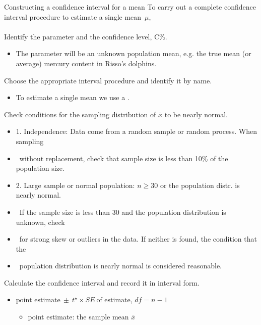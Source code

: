 \begin{onebox}{Constructing a confidence interval for a mean}
To carry out a complete confidence interval procedure to estimate a single \mbox{mean $\mu$,}
\\
\\
 Identify the parameter and the confidence level, C\%. \vspace{-1mm}
\begin{itemize} 
\item[] The parameter will be an unknown population mean, e.g. the true mean (or average) mercury content in Risso's dolphins.
\end{itemize}
 Choose the appropriate interval procedure and identify it by name.\vspace{-1mm}
\begin{itemize}
\item[] To estimate a single mean we use a .
\end{itemize}
 Check conditions for the sampling distribution of $\bar{x}$ to be nearly normal.\vspace{-1mm}
\begin{itemize}
\setlength{\itemsep}{0mm}
\item[] 1. Independence:  Data come from a random sample or random process.  When sampling 
\item[] \quad \ without replacement, check that sample size is less than 10\% of the population size.
\item[] 2. Large sample or normal population:  $n\ge 30$ or the population distr. is nearly normal.
\item[] \quad \ If the sample size is less than 30 and the population distribution is unknown, check 
\item[] \quad \ for strong skew or outliers in the data.  If neither is found, the condition that the 
\item[] \quad \ population distribution is nearly normal is considered reasonable.  
\end{itemize}
 Calculate the confidence interval and record it in interval form. 
\begin{itemize}
\item[] $\text{point estimate}\ \pm\ t^{\star} \times SE\ \text{of estimate}$, \quad $df = n - 1$
\begin{itemize}
\item[] point estimate: the sample mean $\bar{x}$

\end{itemize}
\end{itemize}
\end{onebox}
